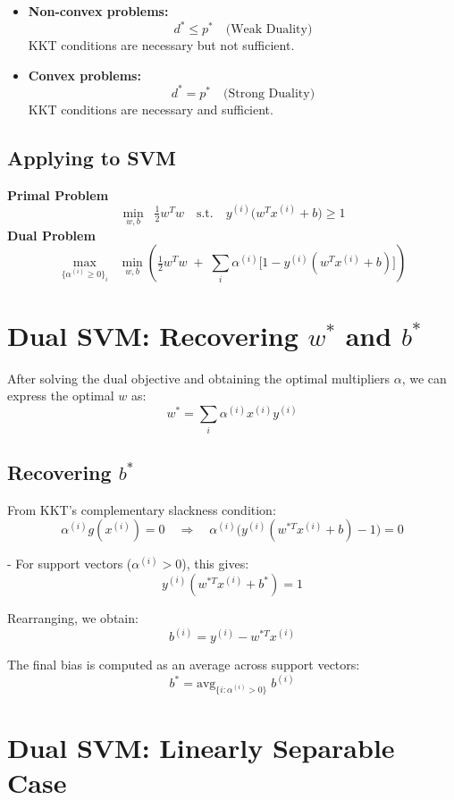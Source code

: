 \documentclass[11pt]{article}
\begin{document}
\begin{itemize}
    \item \textbf{Non-convex problems:}
    \[
    d^* \leq p^* \quad \text{(Weak Duality)}
    \]
    KKT conditions are necessary but not sufficient.

    \item \textbf{Convex problems:}
    \[
    d^* = p^* \quad \text{(Strong Duality)}
    \]
    KKT conditions are necessary and sufficient.
\end{itemize}

\subsection*{Applying to SVM}

\textbf{Primal Problem}
\[
\min_{w,b} \;\; \tfrac{1}{2} w^T w 
\quad \text{s.t.} \quad 
y^{(i)} \big(w^T x^{(i)} + b \big) \geq 1
\]
\textbf{Dual Problem}
\[
\max_{\{\alpha^{(i)} \geq 0\}_i} 
\;\; \min_{w,b} \left( 
\tfrac{1}{2} w^T w \;+\; 
\sum_i \alpha^{(i)} \Big[1 - y^{(i)} (w^T x^{(i)} + b) \Big] 
\right)
\]

\section*{Dual SVM: Recovering $w^*$ and $b^*$}

After solving the dual objective and obtaining the optimal multipliers $\alpha$, we can express the optimal $w$ as:
\[
w^* = \sum_i \alpha^{(i)} x^{(i)} y^{(i)}
\]

\subsection*{Recovering $b^*$}
From KKT’s complementary slackness condition:
\[
\alpha^{(i)} g(x^{(i)}) = 0
\quad \Rightarrow \quad
\alpha^{(i)} \Big( y^{(i)} (w^{*T} x^{(i)} + b) - 1 \Big) = 0
\]

- For support vectors ($\alpha^{(i)} > 0$), this gives:
\[
y^{(i)} (w^{*T} x^{(i)} + b^*) = 1
\]

Rearranging, we obtain:
\[
b^{(i)} = y^{(i)} - w^{*T} x^{(i)}
\]

The final bias is computed as an average across support vectors:
\[
b^* = \text{avg}_{\{i : \alpha^{(i)} > 0\}} \; b^{(i)}
\]

\section*{Dual SVM: Linearly Separable Case}
\end{document}

